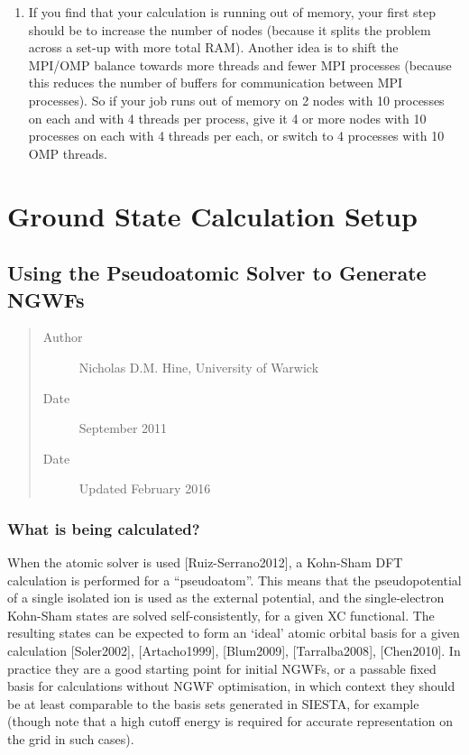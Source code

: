 \documentclass[letterpaper,10pt,english]{sphinxmanual}
\begin{document}
\begin{enumerate}
\item {} 
If you find that your calculation is running out of memory, your
first step should be to increase the number of nodes (because it
splits the problem across a set-up with more total RAM). Another idea
is to shift the MPI/OMP balance towards more threads and fewer MPI
processes (because this reduces the number of buffers for
communication between MPI processes). So if your job runs out of
memory on 2 nodes with 10 processes on each and with 4 threads per
process, give it 4 or more nodes with 10 processes on each with 4
threads per each, or switch to 4 processes with 10 OMP threads.

\end{enumerate}


\chapter{Ground State Calculation Setup}
\label{\detokenize{index_ground_state:ground-state-calculation-setup}}\label{\detokenize{index_ground_state::doc}}

\section{Using the Pseudoatomic Solver to Generate NGWFs}
\label{\detokenize{pseudoatomic_solver::doc}}\label{\detokenize{pseudoatomic_solver:using-the-pseudoatomic-solver-to-generate-ngwfs}}\begin{quote}\begin{description}
\item[{Author}] \leavevmode
Nicholas D.M. Hine, University of Warwick

\item[{Date}] \leavevmode
September 2011

\item[{Date}] \leavevmode
Updated February 2016

\end{description}\end{quote}


\subsection{What is being calculated?}
\label{\detokenize{pseudoatomic_solver:what-is-being-calculated}}
When the atomic solver is used {[}Ruiz-Serrano2012{]}, a
Kohn-Sham DFT calculation is performed for a “pseudoatom”. This means
that the pseudopotential of a single isolated ion is used as the
external potential, and the single-electron Kohn-Sham states are solved
self-consistently, for a given XC functional. The resulting states can
be expected to form an ‘ideal’ atomic orbital basis for a given
calculation {[}Soler2002{]}, {[}Artacho1999{]}, {[}Blum2009{]}, {[}Tarralba2008{]}, {[}Chen2010{]}.
In practice they are a good starting point for initial NGWFs, or a
passable fixed basis for calculations without NGWF optimisation, in
which context they should be at least comparable to the basis sets
generated in SIESTA, for example (though note that a high cutoff energy
is required for accurate representation on the grid in such cases).
\end{document}
